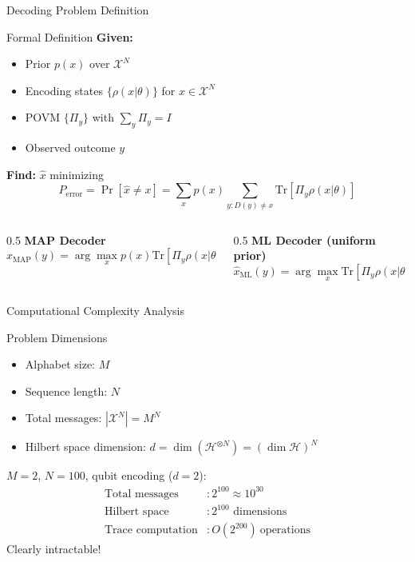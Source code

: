 \documentclass[10pt]{beamer}
\begin{document}
\begin{frame}{Decoding Problem Definition}
\begin{block}{Formal Definition}
\textbf{Given:}
\begin{itemize}
\item Prior $p(x)$ over $\mathcal{X}^N$
\item Encoding states $\{\rho(x|\theta)\}$ for $x \in \mathcal{X}^N$
\item POVM $\{\Pi_y\}$ with $\sum_y \Pi_y = I$
\item Observed outcome $y$
\end{itemize}

\textbf{Find:} $\hat{x}$ minimizing
\begin{equation*}
P_{\text{error}} = \Pr[\hat{x} \neq x] = \sum_x p(x)\sum_{y:D(y)\neq x} \text{Tr}[\Pi_y\rho(x|\theta)]
\end{equation*}
\end{block}

\begin{columns}
\begin{column}{0.5\textwidth}
\textbf{MAP Decoder}
\begin{equation*}
\hat{x}_{\text{MAP}}(y) = \arg\max_x p(x)\text{Tr}[\Pi_y\rho(x|\theta)]
\end{equation*}
\end{column}

\begin{column}{0.5\textwidth}
\textbf{ML Decoder (uniform prior)}
\begin{equation*}
\hat{x}_{\text{ML}}(y) = \arg\max_x \text{Tr}[\Pi_y\rho(x|\theta)]
\end{equation*}
\end{column}
\end{columns}
\end{frame}

\begin{frame}{Computational Complexity Analysis}
\begin{block}{Problem Dimensions}
\begin{itemize}
\item Alphabet size: $M$
\item Sequence length: $N$
\item Total messages: $|\mathcal{X}^N| = M^N$
\item Hilbert space dimension: $d = \dim(\mathcal{H}^{\otimes N}) = (\dim\mathcal{H})^N$
\end{itemize}
\end{block}

\begin{example}
$M = 2$, $N = 100$, qubit encoding ($d = 2$):
\begin{align*}
\text{Total messages} &: 2^{100} \approx 10^{30} \\
\text{Hilbert space} &: 2^{100} \text{ dimensions} \\
\text{Trace computation} &: O(2^{200}) \ \text{operations}
\end{align*}
Clearly intractable!
\end{example}
\end{frame}
\end{document}
